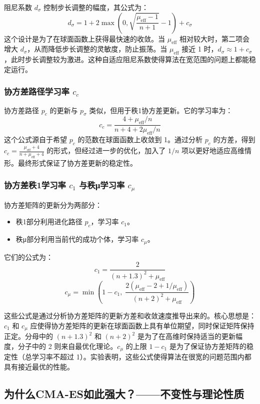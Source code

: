 \documentclass[lang=cn,zihao=-4,a4paper,fontset=windows]{beautybook}
\begin{document}
阻尼系数 $d_\sigma$ 控制步长调整的幅度，其公式为：
\[
d_\sigma = 1 + 2\max\left(0, \sqrt{\frac{\mu_{\text{eff}}-1}{n+1}}-1\right) + c_\sigma
\]
这个设计是为了在球面函数上获得最快速的收敛。当 $\mu_{\text{eff}}$ 相对较大时，第二项会增大 $d_\sigma$，从而降低步长调整的灵敏度，防止振荡。当 $\mu_{\text{eff}}$ 接近 1 时，$d_\sigma \approx 1 + c_\sigma$，此时步长调整较为激进。这种自适应阻尼系数使得算法在宽范围的问题上都能稳定运行。

\subsubsection{协方差路径学习率 $c_c$}

协方差路径 $p_c$ 的更新与 $p_\sigma$ 类似，但用于秩1协方差更新。它的学习率为：
\[
c_c = \frac{4+\mu_{\text{eff}}/n}{n+4+2\mu_{\text{eff}}/n}
\]
这个公式源自于希望 $p_c$ 的范数在球面函数上收敛到 1。通过分析 $p_c$ 的方差，得到 $c_c = \frac{\mu_{\text{eff}}+4}{n+\mu_{\text{eff}}+4}$ 的形式，但经过进一步的优化，加入了 $1/n$ 项以更好地适应高维情形。最终形式保证了协方差更新的稳定性。

\subsubsection{协方差秩1学习率 $c_1$ 与秩μ学习率 $c_\mu$}

协方差矩阵的更新分为两部分：
\begin{itemize}
    \item 秩1部分利用进化路径 $p_c$，学习率 $c_1$。
    \item 秩μ部分利用当前代的成功个体，学习率 $c_\mu$。
\end{itemize}
它们的公式为：
\[
c_1 = \frac{2}{(n+1.3)^2+\mu_{\text{eff}}}
\]
\[
c_\mu = \min\left(1-c_1,\; \frac{2(\mu_{\text{eff}}-2+1/\mu_{\text{eff}})}{(n+2)^2+\mu_{\text{eff}}}\right)
\]

这些公式是通过分析协方差矩阵的更新方差和收敛速度推导出来的。核心思想是：$c_1$ 和 $c_\mu$ 应使得协方差矩阵的更新在球面函数上具有单位期望，同时保证矩阵保持正定。分母中的 $(n+1.3)^2$ 和 $(n+2)^2$ 是为了在高维时保持适当的更新幅度，分子中的 2 则来自最优化理论。$c_\mu$ 的上限 $1-c_1$ 是为了保证协方差矩阵的稳定性（总学习率不超过 1）。实验表明，这些公式使得算法在很宽的问题范围内都具有接近最优的性能。

\subsection{为什么CMA-ES如此强大？——不变性与理论性质}
\end{document}
